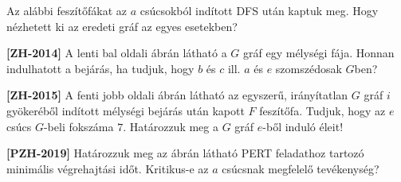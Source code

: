 \documentclass[a4paper,12pt]{article}
\begin{document}
\begin{enumerate}
        \item Az alábbi feszítőfákat az $a$ csúcsokból indított DFS után kaptuk meg. Hogy nézhetett ki az eredeti gráf az egyes esetekben? 
        \begin{figure}[!h]
            \centering
            \begin{subfigure}{0.2\textwidth}
                \centering
                
            \end{subfigure}
            \begin{subfigure}{0.2\textwidth}
                \centering
                
            \end{subfigure}
            \begin{subfigure}{0.2\textwidth}
                \centering
                
            \end{subfigure}
            \begin{subfigure}{0.2\textwidth}
                \centering
                
            \end{subfigure}
        \end{figure}
        

        \item \textbf{[ZH-2014]} A lenti bal oldali ábrán látható a $G$ gráf egy mélységi fája. Honnan indulhatott a bejárás, ha tudjuk, hogy $b$ és $c$ ill. $a$ és $e$ szomszédosak $G$ben?

        \begin{minipage}{6in}
            \centering
            \raisebox{-0.5\height}{} \hspace{1in}
            \raisebox{-0.5\height}{}
        \end{minipage}

        \item \textbf{[ZH-2015]} A fenti jobb oldali ábrán látható az egyszerű, irányítatlan $G$ gráf $i$ gyökeréből indított mélységi bejárás után kapott $F$ feszítőfa. Tudjuk, hogy az $e$ csúcs $G$-beli fokszáma $7$. Határozzuk meg a $G$ gráf $e$-ből induló éleit!
        
        \begin{minipage}{0.6\textwidth}
            \item \textbf{[PZH-2019]} Határozzuk meg az ábrán látható PERT feladathoz tartozó minimális végrehajtási időt. Kritikus-e az $a$ csúcsnak megfelelő tevékenység?
        \end{minipage}
        \begin{minipage}{0.3\textwidth}
            \centering
            
        \end{minipage}


\end{enumerate}
\end{document}
